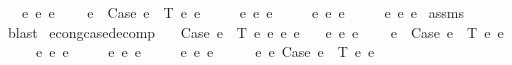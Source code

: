 \begin{isabellebody}
\ \ \ {\isachardoublequoteopen}{\isasymexists}e{}{\isacharprime}{\kern0pt}\ e{}{\isacharprime}{\kern0pt}\ e{}{\isacharprime}{\kern0pt}{\isachardot}{\kern0pt}\isanewline
\ \ \ \ e{\isacharprime}{\kern0pt}\ {\isacharequal}{\kern0pt}\ Case\ e{}{\isacharprime}{\kern0pt}\ {\isasymGamma}\ T\ e{}{\isacharprime}{\kern0pt}\ e{}{\isacharprime}{\kern0pt}\isanewline
\ \ \ \ {\isasymand}\ e{}{\isacharprime}{\kern0pt}\ {\isasymsimeq}e\ e{}\isanewline
\ \ \ \ {\isasymand}\ e{}{\isacharprime}{\kern0pt}\ {\isasymsimeq}e\ e{}\isanewline
\ \ \ \ {\isasymand}\ e{}{\isacharprime}{\kern0pt}\ {\isasymsimeq}e\ e{}{\isachardoublequoteclose}\isanewline
%
\isadelimproof
%
\endisadelimproof
%
\isatagproof
{}\isamarkupfalse%
\ assms\ \isamarkupfalse%
\ blast%
\endisatagproof
{\isafoldproof}%
%
\isadelimproof
\isanewline
%
\endisadelimproof
\isanewline
\isanewline
{}\isamarkupfalse%
\ econg{\isacharunderscore}{\kern0pt}case{\isacharunderscore}{\kern0pt}decomp{}{\isacharcolon}{\kern0pt}\isanewline
\ \ \ {\isachardoublequoteopen}Case\ e{}\ {\isasymGamma}\ T\ e{}\ e{}\ {\isasymsimeq}e\ e{\isacharprime}{\kern0pt}{\isachardoublequoteclose}\isanewline
\ \ \ {\isachardoublequoteopen}{\isasymexists}e{}{\isacharprime}{\kern0pt}\ e{}{\isacharprime}{\kern0pt}\ e{}{\isacharprime}{\kern0pt}{\isachardot}{\kern0pt}\isanewline
\ \ \ \ e{\isacharprime}{\kern0pt}\ {\isacharequal}{\kern0pt}\ Case\ e{}{\isacharprime}{\kern0pt}\ {\isasymGamma}\ T\ e{}{\isacharprime}{\kern0pt}\ e{}{\isacharprime}{\kern0pt}\isanewline
\ \ \ \ {\isasymand}\ e{}\ {\isasymsimeq}e\ e{}{\isacharprime}{\kern0pt}\isanewline
\ \ \ \ {\isasymand}\ e{}\ {\isasymsimeq}e\ e{}{\isacharprime}{\kern0pt}\isanewline
\ \ \ \ {\isasymand}\ e{}\ {\isasymsimeq}e\ e{}{\isacharprime}{\kern0pt}{\isachardoublequoteclose}\isanewline
%
\isadelimproof
%
\endisadelimproof
%
\isatagproof
{}\isamarkupfalse%
\ {\isacharminus}{\kern0pt}\isanewline
\ \ \isamarkupfalse%
\ {\isachardoublequoteopen}e{\isacharprime}{\kern0pt}\ {\isasymsimeq}e\ Case\ e{}\ {\isasymGamma}\ T\ e{}\ e{}{\isachardoublequoteclose}\isanewline
\ \ \ \ \isamarkupfalse%

\end{isabellebody}

